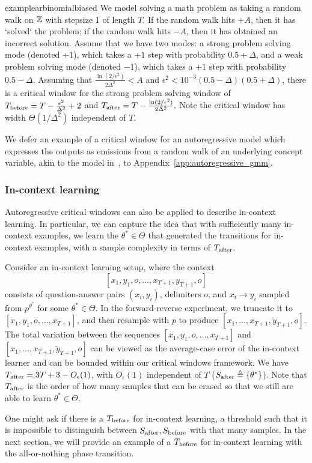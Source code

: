 \begin{restatable}{example}{arbinomialbiased}\label{example:ar_binomial} We model solving a math problem as taking a random walk on $\mathbb{Z}$ with stepsize $1$ of length $T$. If the random walk hits $+A$, then it has `solved` the problem; if the random walk hits $-A$, then it has obtained an incorrect solution. Assume that we have two modes: a strong problem solving mode (denoted $+1$), which takes a $+1$ step with probability $0.5+\Delta$, and a weak problem solving mode (denoted $-1$), which takes a $+1$ step with probability $0.5-\Delta$. Assuming that $\frac{\ln (2/\epsilon^2)}{2\Delta^2} < A$ and  $\epsilon^2 < 10^{-3}(0.5-\Delta)(0.5+\Delta)$, there is a critical window for the strong problem solving window of $T_{\mathrm{before}}= T-\frac{\epsilon^2}{\Delta^2}+2$ and $T_{\mathrm{after}}  = T-\frac{\ln (2/\epsilon^2)}{2\Delta^2}.$ Note the critical window has width $\Theta(1/\Delta^2)$ independent of $T$. 
\end{restatable}
\noindent We defer an example of a critical window for an autoregressive model which expresses the outputs as emissions from a random walk of an underlying concept variable, akin to the model in~\citep{arora2019latentvariablemodelapproach}, to Appendix~\ref{app:autoregressive_gmm}.

\subsubsection{In-context learning}
Autoregressive critical windows can also be applied to describe in-context learning. In particular, we can capture the idea that with sufficiently many in-context examples, we learn the $\theta^* \in \Theta$ that generated the transitions for in-context examples, with a sample complexity in terms of $T_{\mathrm{after}}$.
\begin{example}
Consider an in-context learning setup, where the context $$[x_1,y_1,o,\dots,x_{T+1},y_{T+1},o]$$ consists of question-answer pairs $(x_i,y_i)$, delimiters $o$, and $x_i \to y_i$ sampled from $p^{\theta^*}$ for some $\theta^* \in \Theta$. In the forward-reverse experiment, we truncate it to $[x_1,y_1,o,\dots,x_{T+1}]$, and then resample with $p$ to produce $[x_1,\dots,x_{T+1},\tilde{y}_{T+1},o]$. The total variation between the sequences $[x_1,y_1,o,\dots,x_{T+1}]$ and $[x_1,\dots,x_{T+1},\tilde{y}_{T+1},o]$ can be viewed as the average-case error of the in-context learner and can be bounded within our critical windows framework. We have $T_{\mathrm{after}}=3T+3-O_{\epsilon}(1)$, with $O_{\epsilon}(1)$ independent of $T$ ($S_{\mathrm{after}} \triangleq\{\theta^*\}$). Note that $T_{\mathrm{after}}$ is the order of how many samples that can be erased so that we still are able to learn $\theta^* \in \Theta$. 
\end{example}
One might ask if there is a $T_{\mathrm{before}}$ for in-context learning, a threshold such that it is impossible to distinguish between $S_{\mathrm{after}},S_{\mathrm{before}}$ with that many samples. In the next section, we will provide an example of a $T_{\mathrm{before}}$ for in-context learning with the all-or-nothing phase transition.
